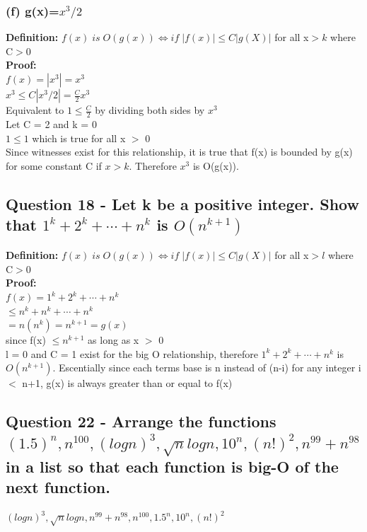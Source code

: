 \documentclass{article}
\begin{document}
\subsubsection[f]{(f) g(x)=$x^3/2$}
\textbf{Definition: }$f(x) \; is \;O(g(x)) \Longleftrightarrow if \; |f(x)| \leq C|g(X)|$ for all x$>k$ where C$>$0\\
\textbf{Proof:}\\
$f(x) = |x^3| = x^3$\\
$x^3 \leq C|x^3/2| = \frac{C}{2}x^3$\\
Equivalent to $1\leq \frac{C}{2}$ by dividing both sides by $x^3$\\
Let C = 2 and k = 0\\
$1 \leq 1$ which is true for all x $>$ 0\\
Since witnesses exist for this relationship, it is true that f(x) is bounded by g(x) for some constant C if $x>k$. Therefore $x^3$ is O(g(x)).

\subsection[18]{Question 18 - Let k be a positive integer. Show that $1^k + 2^k + \cdots + n^k$ is $O(n^{k+1})$}
\textbf{Definition: }$f(x) \; is \;O(g(x)) \Longleftrightarrow if \; |f(x)| \leq C|g(X)|$ for all x$>l$ where C$>$0\\
\textbf{Proof:}\\
$f(x) = 1^k + 2^k + \cdots + n^k$\\
\indent \indent $\leq n^k + n^k + \cdots + n^k$\\
\indent \indent $= n(n^k) = n^{k+1} = g(x)$\\
since f(x) $\leq n^{k+1}$ as long as x $>$ 0 \\
l = 0 and C = 1 exist for the big O relationship, therefore $1^k + 2^k + \cdots + n^k$ is $O(n^{k+1})$. Escentially since each terms base is n instead of (n-i) for any integer i $<$ n+1, g(x) is always greater than or equal to f(x) 

\subsection[22]{Question 22 - Arrange the functions $(1.5)^n, n^{100}, (logn)^3
, \sqrt{n} logn, 10^n, (n!)^2, n^{99} +n^{98}$ in a list so that each function
is big-O of the next function. }

$(logn)^3 , \sqrt{n} logn , n^{99}+n^{98}, n^{100}, 1.5^n , 10^n, (n!)^2 $
\end{document}
